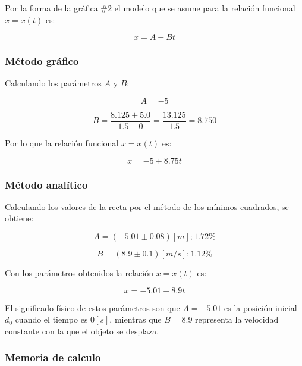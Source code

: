 \documentclass[letter,11pt]{article}
\begin{document}
Por la forma de la gráfica \#2 el modelo que se asume para la relación funcional
$x = x(t)$ es:

\begin{equation*}
    x = A + B t
\end{equation*}

\subsubsection{Método gráfico}

Calculando los parámetros $A$ y $B$:

\begin{equation*}
    A = -5
\end{equation*}

\begin{equation*}
    B = \frac{8.125+5.0}{1.5-0} = \frac{13.125}{1.5} = 8.750
\end{equation*}

Por lo que la relación funcional $x = x(t)$ es:

\begin{equation}
    x = -5 + 8.75 t
\end{equation}

\subsubsection{Método analítico}

Calculando los valores de la recta por el método de los mínimos cuadrados, se
obtiene:

\begin{equation*}
    A = (-5.01 \pm 0.08)[m];1.72\%
\end{equation*}

\begin{equation*}
    B = (8.9 \pm 0.1)[m/s];1.12\%
\end{equation*}

Con los parámetros obtenidos la relación $x = x(t)$ es:

\begin{equation}
    x = -5.01 + 8.9 t
\end{equation}

El significado físico de estos parámetros son que $A = -5.01$ es la posición
inicial $d_0$ cuando el tiempo es $0 [s]$, mientras que $B = 8.9$ representa la
velocidad constante con la que el objeto se desplaza.

\subsubsection{Memoria de calculo}
\end{document}
